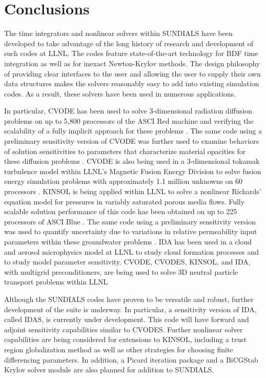 \section{Conclusions}\label{s:conclusions}

The time integrators and nonlinear solvers within SUNDIALS have been
developed to take advantage of the long history of research and development
of such codes at LLNL.  The codes feature state-of-the-art
technology for BDF time integration as well as for inexact Newton-Krylov
methods.  The design philosophy of providing clear interfaces to the
user and allowing the user to supply their own data structures makes the
solvers reasonably easy to add into existing simulation codes.  As a result,
these solvers have been used in numerous applications.

In particular, CVODE has been used to solve 3-dimensional radiation diffusion
problems on up to 5,800 processors of the ASCI Red machine and
verifying the scalability
of a fully implicit approach for these problems \cite{BrWo:01}.
The same code using a preliminary sensitivity version of CVODE was
further used to examine behaviors of solution sensitivities to
parameters that characterize material opacities for these
diffusion problems \cite{LWG:03,LHB:00}.  CVODE is also being used in a
3-dimensional tokamak turbulence model within LLNL's
Magnetic Fusion Energy Division to solve fusion energy simulation problems
with approximately 1.1 million unknowns on 60 processors \cite{RXH:02}.
KINSOL is being applied within
LLNL to solve a nonlinear Richards' equation model for pressures in
variably saturated porous media flows.
Fully scalable solution performance of this code has been obtained on
up to 225 processors of ASCI Blue \cite{JoWo:01,Woo:98}.  The same code using
a preliminary sensitivity version was used to quantify
uncertainty due to variations in relative permeability input parameters
within these groundwater problems \cite{WGM:02}.
IDA has been used in a cloud and aerosol microphysics
model at LLNL to study cloud formation processes and to study model
parameter sensitivity.
CVODE, CVODES, KINSOL, and IDA, with multigrid preconditioners,
are being used to
solve 3D neutral particle transport problems within LLNL

Although the SUNDIALS codes have proven to be versatile and
robust, further development of the suite is underway. In
particular, a sensitivity version of IDA, called IDAS, is
currently under development.  This code will have forward and
adjoint sensitivity capabilities similar to CVODES.  Further
nonlinear solver capabilities are being considered for extensions
to KINSOL, including a trust region globalization method as well
as other strategies for choosing finite differencing parameters.
In addition, a Picard iteration package and a BiCGStab Krylov
solver module are also planned for addition to SUNDIALS.
